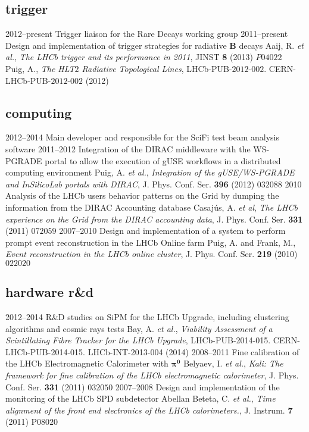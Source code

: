 \subsection{trigger}
    \cventry
    {2012--present}
    {Trigger liaison for the Rare Decays working group}
    {}
    {}
    \cventry
    {2011--present}
    {Design and implementation of trigger strategies for radiative $\mathbf{B}$ decays}
    {}
    {Aaij, R. \textit{et al.}, \textit{The LHCb trigger and its performance in 2011}, JINST \textbf{8} (2013) $P04022$\\
     Puig, A., \textit{The HLT$2$ Radiative Topological Lines}, LHCb-PUB-$2012$-$002$. CERN-LHCb-PUB-$2012$-$002$ (2012)}

\subsection{computing}
    \cventry
    {2012--2014}
    {Main developer and responsible for the SciFi test beam analysis software}
    {}
    {}
    \cventry
    {2011--2012}
    {Integration of the DIRAC middleware with the WS-PGRADE portal to allow the execution of gUSE workflows in a distributed computing environment}
    {}
    {Puig, A. \emph{et al.}, \textit{Integration of the gUSE/WS-PGRADE and InSilicoLab portals with DIRAC}, J. Phys. Conf. Ser. \textbf{396} (2012) $032088$}
    \cventry
    {2010}
    {Analysis of the LHCb users behavior patterns on the Grid by dumping the information from the DIRAC Accounting database}
    {}
    {Casaj{\'u}s, A. \emph{et al}, \textit{The LHCb experience on the Grid from the DIRAC accounting data}, J. Phys. Conf. Ser. \textbf{331} (2011) $072059$}
    \cventry
    {2007--2010}
    {Design and implementation of a system to perform prompt event reconstruction in the LHCb Online farm}
    {}
    {Puig, A. and Frank, M., \textit{Event reconstruction in the LHCb online cluster}, J. Phys. Conf. Ser. \textbf{219} (2010) $022020$}

\subsection{hardware r\&d}
    \cventry
    {2012--2014}
    {R\&D studies on SiPM for the LHCb Upgrade, including clustering algorithms and cosmic rays tests}
    {}
    {Bay, A. \emph{et al.}, \textit{Viability Assessment of a Scintillating Fibre Tracker for the LHCb Upgrade}, LHCb-PUB-2014-015. CERN-LHCb-PUB-2014-015. LHCb-INT-2013-004 (2014)}
    \cventry
    {2008--2011}
    {Fine calibration of the LHCb Electromagnetic Calorimeter with $\mathbf{\pi^0}$}
    {}
    {Belyaev, I. \emph{et al.}, \textit{Kali: The framework for fine calibration of the LHCb electromagnetic calorimeter}, J. Phys. Conf. Ser. \textbf{331} (2011) $032050$}
    \cventry
    {2007--2008}
    {Design and implementation of the monitoring of the LHCb SPD subdetector}
    {}
    {Abellan Beteta, C. \emph{et al.}, \textit{Time alignment of the front end electronics of the LHCb calorimeters.}, J. Instrum. \textbf{7} (2011) P$08020$}

